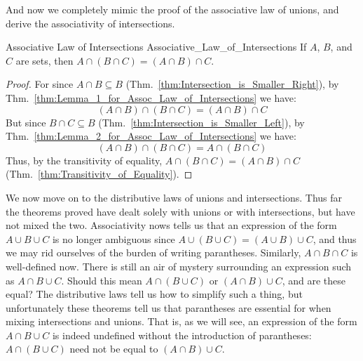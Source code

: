         And now we completely mimic the proof of the associative law of unions,
        and derive the associativity of intersections.
        \begin{ltheorem}{Associative Law of Intersections}
                        {Associative_Law_of_Intersections}
            If $A$, $B$, and $C$ are sets, then
            $A\cap(B\cap{C})=(A\cap{B})\cap{C}$.
        \end{ltheorem}
        \begin{proof}
            For since $A\cap{B}\subseteq{B}$
            (Thm.~\ref{thm:Intersection_is_Smaller_Right}), by
            Thm.~\ref{thm:Lemma_1_for_Assoc_Law_of_Intersections} we have:
            \begin{equation}
                (A\cap{B})\cap(B\cap{C})=(A\cap{B})\cap{C}
            \end{equation}
            But since $B\cap{C}\subseteq{B}$
            (Thm.~\ref{thm:Intersection_is_Smaller_Left}),
            by Thm.~\ref{thm:Lemma_2_for_Assoc_Law_of_Intersections} we have:
            \begin{equation}
                (A\cap{B})\cap(B\cap{C})=A\cap(B\cap{C})
            \end{equation}
            Thus, by the transitivity of equality,
            $A\cap(B\cap{C})=(A\cap{B})\cap{C}$
            (Thm.~\ref{thm:Transitivity_of_Equality}).
        \end{proof}
        We now move on to the distributive laws of unions and intersections.
        Thus far the theorems proved have dealt solely with unions or with
        intersections, but have not mixed the two. Associativity nows tells us
        that an expression of the form $A\cup{B}\cup{C}$ is no longer
        ambiguous since $A\cup(B\cup{C})=(A\cup{B})\cup{C}$, and thus we may rid
        ourselves of the burden of writing parantheses. Similarly,
        $A\cap{B}\cap{C}$ is well-defined now. There is still an air of mystery
        surrounding an expression such as $A\cap{B}\cup{C}$. Should this mean
        $A\cap(B\cup{C})$ or $(A\cap{B})\cup{C}$, and are these equal? The
        distributive laws tell us how to simplify such a thing, but
        unfortunately these theorems tell us that parantheses are essential for
        when mixing intersections and unions. That is, as we will see, an
        expression of the form $A\cap{B}\cup{C}$ is indeed undefined without
        the introduction of parantheses: $A\cap(B\cup{C})$ need not be equal to
        $(A\cap{B})\cup{C}$.
